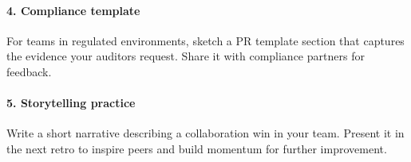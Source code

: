 \paragraph{4. Compliance template} For teams in regulated environments, sketch a PR template section that captures the evidence your auditors request. Share it with compliance partners for feedback.

\paragraph{5. Storytelling practice} Write a short narrative describing a collaboration win in your team. Present it in the next retro to inspire peers and build momentum for further improvement.
